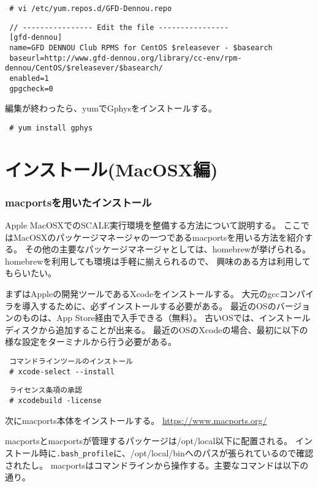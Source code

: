 \begin{verbatim}
 # vi /etc/yum.repos.d/GFD-Dennou.repo
\end{verbatim}

\begin{verbatim}
 // ---------------- Edit the file ----------------
 [gfd-dennou]
 name=GFD DENNOU Club RPMS for CentOS $releasever - $basearch
 baseurl=http://www.gfd-dennou.org/library/cc-env/rpm-dennou/CentOS/$releasever/$basearch/
 enabled=1
 gpgcheck=0
\end{verbatim}
編集が終わったら、yumでGphysをインストールする。
\begin{verbatim}
 # yum install gphys
\end{verbatim}

\section{インストール(MacOSX編)}

\subsubsection{macportsを用いたインストール}

Apple MacOSXでのSCALE実行環境を整備する方法について説明する。
ここではMacOSXのパッケージマネージャの一つであるmacportsを用いる方法を紹介する。
その他の主要なパッケージマネージャとしては、homebrewが挙げられる。homebrewを利用しても環境は手軽に揃えられるので、
興味のある方は利用してもらいたい。

まずはAppleの開発ツールであるXcodeをインストールする。
大元のgccコンパイラを導入するために、必ずインストールする必要がある。
最近のOSのバージョンのものは、App Store経由で入手できる（無料）。
古いOSでは、インストールディスクから追加することが出来る。
最近のOSのXcodeの場合、最初に以下の様な設定をターミナルから行う必要がある。
\begin{verbatim}
 コマンドラインツールのインストール
 # xcode-select --install
\end{verbatim}
\begin{verbatim}
 ライセンス条項の承認
 # xcodebuild -license
\end{verbatim}

次にmacports本体をインストールする。
\url{https://www.macports.org/}

macportsとmacportsが管理するパッケージは/opt/local以下に配置される。
インストール時に\verb|.bash_profile|に、/opt/local/binへのパスが張られているので確認されたし。
macportsはコマンドラインから操作する。主要なコマンドは以下の通り。

